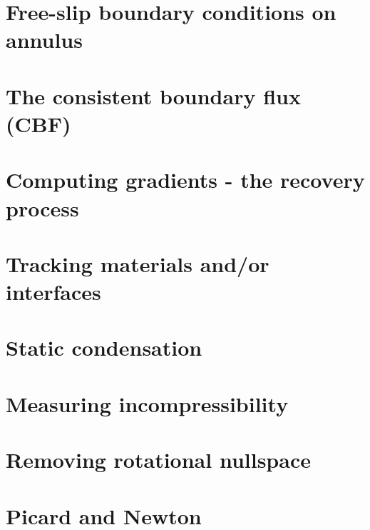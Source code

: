 \section{Free-slip boundary conditions on annulus}\label{ss:fsbc_annulus} %
\newpage %
\section{The consistent boundary flux (CBF) \label{ss:cbf}}  %
\newpage %
\section{Computing gradients - the recovery process \label{ss:gradrecovery}}  %
\newpage %
\section{Tracking materials and/or interfaces}  %
\newpage %
\section{Static condensation}  %
\newpage %
\section{Measuring incompressibility \label{ss_incomp}}  %
\newpage %
\section{Removing rotational nullspace\label{ss_nullspace}}  %
\newpage %
\section{Picard and Newton \label{ss_nonlinear}}  %
\newpage %
